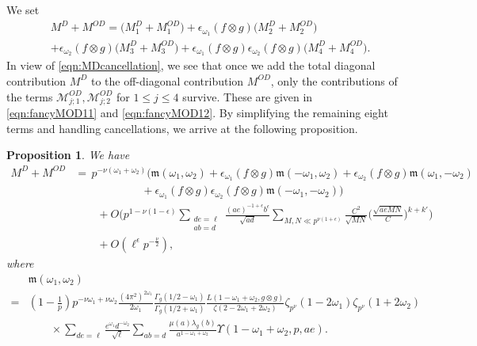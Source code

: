 \documentclass[12pt]{amsart}
\theoremstyle{plain}
\newtheorem{prop}[thm]{Proposition}
\theoremstyle{definition}
\begin{document}
We set
    \begin{align*}
     &M^D  + M^{OD}
     = \big(M^D_{1}  + M^{OD}_{1}\big)
       +  \epsilon_{\omega_1}(f\otimes g)  \big(M^D_{2}  + M^{OD}_{2}\big)
       \\
      &  +  \epsilon_{\omega_2}(f\otimes g)  \big(M^D_{3}  + M^{OD}_{3}\big)
         + \epsilon_{\omega_1}(f\otimes g)  \epsilon_{\omega_2}(f\otimes g) 
          \big(M^D_{4}  + M^{OD}_{4}\big).
    \end{align*}
In view of \eqref{eqn:MDcancellation}, we see that once we add the total diagonal contribution $M^D$ to the off-diagonal contribution $M^{OD}$, only the contributions of the terms $\mathscr{M}^{OD}_{j;1}, \mathscr{M}^{OD}_{j;2}$ for $1\leq j\leq 4$ survive. These are given in \eqref{eqn:fancyMOD11} and \eqref{eqn:fancyMOD12}. By simplifying the remaining eight  terms and handling cancellations, we arrive at the following proposition.


  

    \begin{prop}\label{prop:MD plus MOD}
We have
    \begin{align*}
    M^D  + M^{OD}
   &=\, p^{-\nu(\omega_1+\omega_2)} 
   \Big( \mathfrak{m}(\omega_1, \omega_2 ) 
   + \epsilon_{\omega_1}(f\otimes g) \mathfrak{m}(-\omega_1, \omega_2 ) 
   +\epsilon_{\omega_2}(f\otimes g) \mathfrak{m}(\omega_1, -\omega_2 ) 
   \\
   &\qquad \qquad \qquad+\epsilon_{\omega_1}(f\otimes g)\epsilon_{\omega_2}(f\otimes g)
    \mathfrak{m}(-\omega_1, -\omega_2 ) 
   \Big)\\
   &\hspace{2em}+O\bigg(p^{1-\nu(1-\epsilon)}
    \sum_{\substack{de=\ell\\ab=d}}  \frac{(ae)^{-1+\epsilon}b^{\epsilon}}{\sqrt{ad}}\sum_{M,N\ll p^{\nu(1+\epsilon)}}\frac{C^2}{\sqrt{MN}}\Big(\frac{\sqrt{aeMN}}{C}\Big)^{k+k'}\bigg)\nonumber
    \\&\hspace{2em}+O\left(\ell^{\epsilon}p^{-\frac{\nu}{2}}\right), 
    \end{align*}
where
       \begin{align*}
    &\mathfrak{m}(\omega_1, \omega_2 )
    \\
    =&  \left(1-\frac{1}{p}\right)p^{-\nu\omega_1+\nu\omega_2}\frac{(4\pi^2)^{2\omega_1} }{2\omega_1}  \frac{\Gamma_g(1/2-\omega_1) }{\Gamma_g(1/2+\omega_1)}\frac{L(1-\omega_1+\omega_2, g\otimes g)}{\zeta(2-2\omega_1+2\omega_2)}
    \zeta_{p^\nu}(1-2\omega_1)\zeta_{p^\nu}(1+2\omega_2)\\&\hspace{2em}\times \sum_{de=\ell} 
        \frac{ e^{\omega_1} d^{-\omega_2}}{\sqrt{\ell}}
      \sum_{ab=d} \frac{\mu(a)  \lambda_g(b)}{a^{1-\omega_1+\omega_2} } 
      \Upsilon(1-\omega_1+\omega_2, p, ae) .
    \end{align*}
\end{prop}
\end{document}
